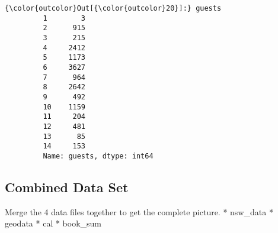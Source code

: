 \documentclass[11pt]{article}
\begin{document}
\begin{Verbatim}[commandchars=\\\{\}]
{\color{outcolor}Out[{\color{outcolor}20}]:} guests
         1        3
         2      915
         3      215
         4     2412
         5     1173
         6     3627
         7      964
         8     2642
         9      492
         10    1159
         11     204
         12     481
         13      85
         14     153
         Name: guests, dtype: int64
\end{Verbatim}
            
    \subsection{Combined Data Set}\label{combined-data-set}

Merge the 4 data files together to get the complete picture. * nsw\_data
* geodata * cal * book\_sum
\end{document}

